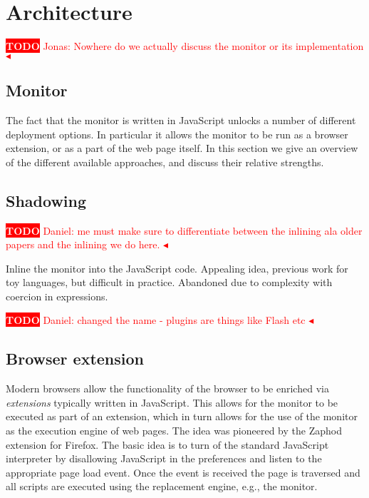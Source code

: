 \documentclass{llncs}
\newcommand{\todo}[1]{\colorbox{red}{\textcolor{white}{\sffamily\bfseries\scriptsize TODO}} \textcolor{red}{#1} \textcolor{red}{$\blacktriangleleft$}}
\begin{document}
\section{Architecture}
\label{sec:arch}

\todo{Jonas: Nowhere do we actually discuss the monitor or its implementation}
\subsection{Monitor}
\label{sec:monitor}
The fact that the monitor is written in JavaScript unlocks a number of
different deployment options. In particular it allows the monitor to be run as
a browser extension, or as a part of the web page itself.  In this section we
give an overview of the different available approaches, and discuss their
relative strengths.


\subsection{Shadowing}
\todo{Daniel: me must make sure to differentiate between the inlining ala older papers and the inlining we do here.}

Inline the monitor into the JavaScript code. Appealing idea, previous work for 
toy languages, but difficult in practice. Abandoned due to complexity with 
coercion in expressions.


\todo{Daniel: changed the name - plugins are things like Flash etc}
\subsection{Browser extension}
%
Modern browsers allow the functionality of the browser to be enriched via
\emph{extensions} typically written in JavaScript. This allows for the monitor
to be executed as part of an extension, which in turn allows for the use of the
monitor as the execution engine of web pages. The idea was pioneered by the
Zaphod\cite{Zaphod} extension for Firefox.  The basic idea is to turn of the
standard JavaScript interpreter by disallowing JavaScript in the preferences
and listen to the appropriate page load event. Once the event is received the
page is traversed and all scripts are executed using the replacement engine,
e.g., the monitor. 
\end{document}
